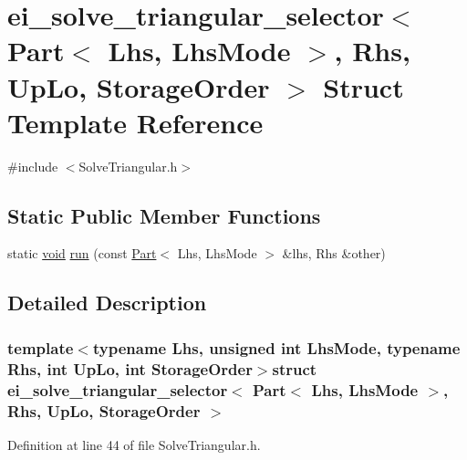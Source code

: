 \hypertarget{structei__solve__triangular__selector_3_01_part_3_01_lhs_00_01_lhs_mode_01_4_00_01_rhs_00_01_up_lo_00_01_storage_order_01_4}{\section{ei\-\_\-solve\-\_\-triangular\-\_\-selector$<$ Part$<$ Lhs, Lhs\-Mode $>$, Rhs, Up\-Lo, Storage\-Order $>$ Struct Template Reference}
\label{structei__solve__triangular__selector_3_01_part_3_01_lhs_00_01_lhs_mode_01_4_00_01_rhs_00_01_up_lo_00_01_storage_order_01_4}
}


{\ttfamily \#include $<$Solve\-Triangular.\-h$>$}

\subsection*{Static Public Member Functions}
\begin{DoxyCompactItemize}
\item 
static \hyperlink{group___u_a_v_objects_plugin_ga444cf2ff3f0ecbe028adce838d373f5c}{void} \hyperlink{structei__solve__triangular__selector_3_01_part_3_01_lhs_00_01_lhs_mode_01_4_00_01_rhs_00_01_up_lo_00_01_storage_order_01_4_ab71c37ebbe51b5f2094b61c2d319b8e7}{run} (const \hyperlink{class_part}{Part}$<$ Lhs, Lhs\-Mode $>$ \&lhs, Rhs \&other)
\end{DoxyCompactItemize}


\subsection{Detailed Description}
\subsubsection*{template$<$typename Lhs, unsigned int Lhs\-Mode, typename Rhs, int Up\-Lo, int Storage\-Order$>$struct ei\-\_\-solve\-\_\-triangular\-\_\-selector$<$ Part$<$ Lhs, Lhs\-Mode $>$, Rhs, Up\-Lo, Storage\-Order $>$}



Definition at line 44 of file Solve\-Triangular.\-h.



